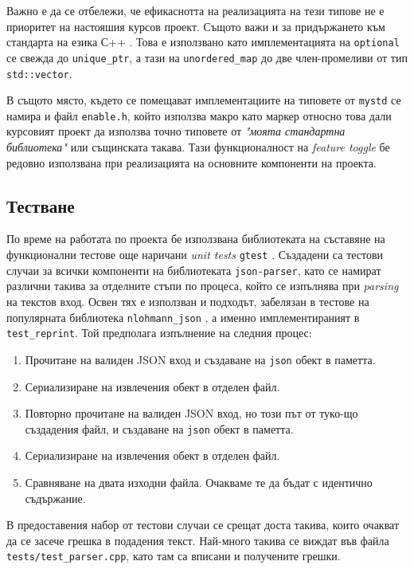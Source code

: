 \documentclass[10pt]{article}
\begin{document}
\par
Важно е да се отбележи, че ефикаснотта на реализацията на тези типове не е приоритет на настояшия курсов проект. Същото важи и за придържането към стандарта на езика С++ \autocite{thestd}. Това е използвано като имплементацията на \verb|optional| се свежда до \verb|unique_ptr|, а тази на \verb|unordered_map| до две член-промеливи от тип \verb|std::vector|.

\par
В същото място, където се помещават имплементациите на типовете от \verb|mystd| се намира и файл \verb|enable.h|, който използва макро като маркер относно това дали курсовият проект да използва точно типовете от \textit{"моята стандартна библиотека"} или същинската такава. Тази функционалност на \textit{feature toggle} бе редовно използвана при реализацията на основните компоненти на проекта.

\subsection{Тестване}
По време на работата по проекта бе използвана библиотеката на съставяне на функционални тестове още наричани \textit{unit tests} \verb|gtest| \autocite{gtest}. Създадени са тестови случаи за всички компоненти на библиотеката
\verb|json-parser|, като се намират различни такива за отделните стъпи по процеса, който се изпълнява при \textit{parsing} на текстов вход. Освен тях е използван и подходът, забелязан в тестове на популярната библиотека 
\verb|nlohmann_json| \autocite{nlohmann_json}, а именно имплементираният в \verb|test_reprint|. Той предполага изпълнение на следния процес:
\begin{enumerate}
\item Прочитане на валиден JSON вход и създаване на \verb|json| обект в паметта.
\item Сериализиране на извлечения обект в отделен файл.
\item Повторно прочитане на валиден JSON вход, но този път от туко-що създадения файл, и създаване на \verb|json| обект в паметта.
\item Сериализиране на извлечения обект в отделен файл.
\item Сравняване на двата изходни файла. Очакваме те да бъдат с идентично съдържание.
\end{enumerate}

\par
В предоставения набор от тестови случаи се срещат доста такива, които очакват да се засече грешка в подадения текст. Най-много такива се виждат във файла \verb|tests/test_parser.cpp|, като там са вписани и получените грешки.
\end{document}
